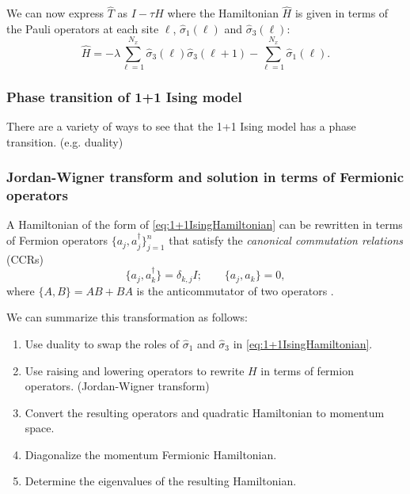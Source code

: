 \documentclass[10pt,reqno]{amsart}
\numberwithin{equation}{section}
\begin{document}
    We can now express $\hat{T}$ as $I- \tau \hat{H}$ where the Hamiltonian $\hat{H}$ is given in terms of the Pauli operators at each site $\ell$, $\hat{\sigma}_1(\ell)$ and $\hat{\sigma}_3(\ell)$:
    \begin{equation}\label{eq:1+1IsingHamiltonian}
    \hat{H}= -\lambda \sum_{\ell=1}^{N_x} \hat{\sigma}_3(\ell)\hat{\sigma}_3(\ell+1) - \sum_{\ell=1}^{N_x} \hat{\sigma}_1(\ell). 
    \end{equation}
    
    \subsubsection{Phase transition of 1+1 Ising model}
    
    There are a variety of ways to see that the 1+1 Ising model has a phase transition.
    (e.g. duality) \cite{KogutGaugeSummary}
    
    \subsubsection{Jordan-Wigner transform and solution in terms of Fermionic operators}
    
    A Hamiltonian of the form of \cref{eq:1+1IsingHamiltonian} can be rewritten in terms of Fermion operators $\{a_j,a^\dagger_j\}_{j=1}^n$ that satisfy the \emph{canonical commutation relations} (CCRs) 
    \[ \{a_j,a_k^\dagger \} = \delta_{k,j}I; \qquad \{a_j,a_k \} =0, \]
    where $\{A,B\} = AB + BA$ is the anticommutator of two operators \cite{KogutGaugeSummary,nielsen_fermions,SchultzMattisLieb64}.
    
    We can summarize this transformation as follows:
    \begin{enumerate}
    	\item Use duality to swap the roles of $\hat{\sigma}_1$ and $\hat{\sigma}_3$ in \cref{eq:1+1IsingHamiltonian}.
    	\item Use raising and lowering operators to rewrite $H$ in terms of fermion operators. (Jordan-Wigner transform)
    	\item Convert the resulting operators and quadratic Hamiltonian to momentum space.
    	\item Diagonalize the momentum Fermionic Hamiltonian.
    	\item Determine the eigenvalues of the resulting Hamiltonian.
    \end{enumerate}
	
\end{document}
